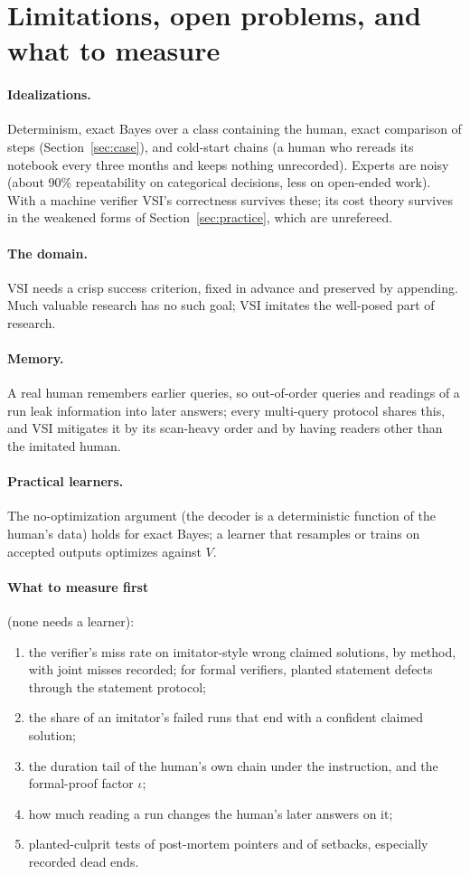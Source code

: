 \documentclass[11pt]{article}
\theoremstyle{definition}
\theoremstyle{remark}
\begin{document}
\section{Limitations, open problems, and what to measure}\label{sec:limits}

\paragraph{Idealizations.} Determinism, exact Bayes over a class containing the human, exact comparison of steps (Section~\ref{sec:case}), and cold-start chains (a human who rereads its notebook every three months and keeps nothing unrecorded). Experts are noisy (about 90\% repeatability on categorical decisions, less on open-ended work). With a machine verifier VSI's correctness survives these; its cost theory survives in the weakened forms of Section~\ref{sec:practice}, which are unrefereed.
\paragraph{The domain.} VSI needs a crisp success criterion, fixed in advance and preserved by appending. Much valuable research has no such goal; VSI imitates the well-posed part of research.
\paragraph{Memory.} A real human remembers earlier queries, so out-of-order queries and readings of a run leak information into later answers; every multi-query protocol shares this, and VSI mitigates it by its scan-heavy order and by having readers other than the imitated human.
\paragraph{Practical learners.} The no-optimization argument (the decoder is a deterministic function of the human's data) holds for exact Bayes; a learner that resamples or trains on accepted outputs optimizes against $V$.
\paragraph{What to measure first} (none needs a learner):
\begin{enumerate}[nosep]
\item the verifier's miss rate on imitator-style wrong claimed solutions, by method, with joint misses recorded; for formal verifiers, planted statement defects through the statement protocol;
\item the share of an imitator's failed runs that end with a confident claimed solution;
\item the duration tail of the human's own chain under the instruction, and the formal-proof factor $\iota$;
\item how much reading a run changes the human's later answers on it;
\item planted-culprit tests of post-mortem pointers and of setbacks, especially recorded dead ends.
\end{enumerate}
\end{document}
